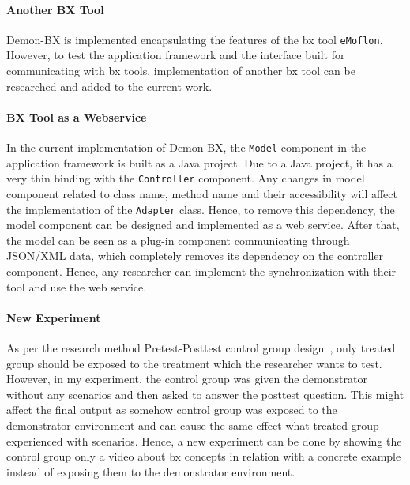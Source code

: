 \paragraph{Another BX Tool}
Demon-BX is implemented encapsulating the features of the bx tool \texttt{eMoflon}. However, to test the application framework and the interface built for communicating with bx tools, implementation of another bx tool can be researched and added to the current work. 

\paragraph{BX Tool as a Webservice}
In the current implementation of Demon-BX, the \texttt{Model} component in the application framework is built as a Java project. Due to a Java project, it has a very thin binding with the \texttt{Controller} component. Any changes in model component related to class name, method name and their accessibility will affect the implementation of the \texttt{Adapter} class. Hence, to remove this dependency, the model component can be designed and implemented as a web service. After that, the model can be seen as a plug-in component communicating through JSON/XML data, which completely removes its dependency on the controller component. Hence, any researcher can implement the synchronization with their tool and use the web service.

\paragraph{New Experiment}
As per the research method Pretest-Posttest control group design~\cite{expandquasiexpdesign}, only treated group should be exposed to the treatment which the researcher wants to test. However, in my experiment, the control group was given the demonstrator without any scenarios and then asked to answer the posttest question. This might affect the final output as somehow control group was exposed to the demonstrator environment and can cause the same effect what treated group experienced with scenarios. Hence, a new experiment can be done by showing the control group only a video about bx concepts in relation with a concrete example instead of exposing them to the demonstrator environment.




